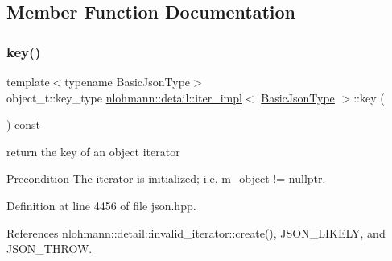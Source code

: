 \subsection{Member Function Documentation}
\mbox{\label{classnlohmann_1_1detail_1_1iter__impl_a3a541a223320f6635f2f188ba54f8818}} 
\subsubsection{\texorpdfstring{key()}{key()}}
{\footnotesize\ttfamily template$<$typename Basic\+Json\+Type$>$ \\
object\+\_\+t\+::key\+\_\+type \hyperlink{classnlohmann_1_1detail_1_1iter__impl}{nlohmann\+::detail\+::iter\+\_\+impl}$<$ \hyperlink{classnlohmann_1_1detail_1_1iter__impl_abf18f18793f84b0222aebb5a2a87da7a}{Basic\+Json\+Type} $>$\+::key (\begin{DoxyParamCaption}{ }\end{DoxyParamCaption}) const\hspace{0.3cm}{\ttfamily [inline]}}



return the key of an object iterator 

\begin{DoxyPrecond}{Precondition}
The iterator is initialized; i.\+e. {\ttfamily m\+\_\+object != nullptr}. 
\end{DoxyPrecond}


Definition at line 4456 of file json.\+hpp.



References nlohmann\+::detail\+::invalid\+\_\+iterator\+::create(), J\+S\+O\+N\+\_\+\+L\+I\+K\+E\+LY, and J\+S\+O\+N\+\_\+\+T\+H\+R\+OW.


